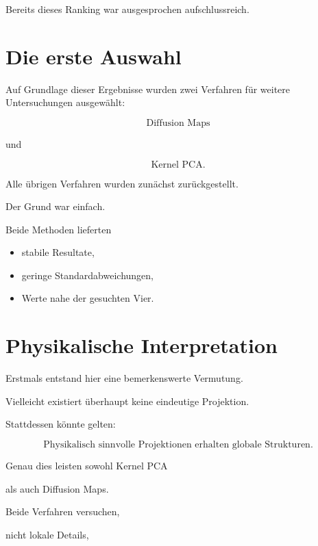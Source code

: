 Bereits dieses Ranking war ausgesprochen aufschlussreich.


\section*{Die erste Auswahl}

Auf Grundlage dieser Ergebnisse wurden zwei Verfahren für weitere Untersuchungen ausgewählt:

\[
\boxed{
\text{Diffusion Maps}
}
\]

und

\[
\boxed{
\text{Kernel PCA}.
}
\]

Alle übrigen Verfahren wurden zunächst zurückgestellt.

Der Grund war einfach.

Beide Methoden lieferten

\begin{itemize}

\item

stabile Resultate,

\item

geringe Standardabweichungen,

\item

Werte nahe der gesuchten Vier.

\end{itemize}


\section*{Physikalische Interpretation}

Erstmals entstand hier eine bemerkenswerte Vermutung.

Vielleicht existiert überhaupt keine eindeutige Projektion.

Stattdessen könnte gelten:

\[
\boxed{
\text{Physikalisch sinnvolle Projektionen erhalten globale Strukturen.}
}
\]

Genau dies leisten sowohl Kernel PCA

als auch Diffusion Maps.

Beide Verfahren versuchen,

nicht lokale Details,

